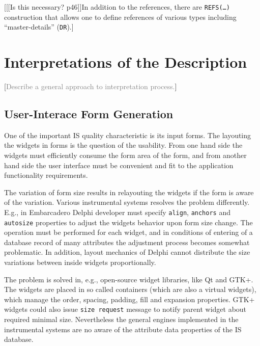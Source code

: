 \documentclass[conference]{IEEEtran}
\newcommand{\e}[2][fcolor]{\textcolor{pcolor}{[}\textcolor{#1}{#2}\textcolor{pcolor}{]}}
\begin{document}
\e{[[Is this necessary? p46]]In addition to the references, there are \texttt{REFS(\ldots)} construction that allows one to define references of various types including ``master-details'' (\texttt{DR}).}











\section{Interpretations of the Description}
\label{sec:interpr-descr}

\e[gray]{Describe a general approach to interpretation process.}

\subsection{User-Interace Form Generation}
\label{sec:user-interace-form}
One of the important IS quality characteristic is its input forms.  The layouting the widgets in forms is the question of the usability.  From one hand side the widgets must efficiently consume the form area of the form, and from another hand side the user interface must be convenient and fit to the application functionality requirements.

The variation of form size results in relayouting the widgets if the form is aware of the variation.  Various instrumental systems resolves the problem differently.  E.g., in Embarcadero Delphi developer must specify \texttt{align}, \texttt{anchors} and \texttt{autosize} properties to adjust the widgets behavior upon form size change.  The operation must be performed for each widget, and in conditions of entering of a database record of many attributes the adjustment process becomes somewhat problematic.  In addition, layout mechanics of Delphi cannot distribute the size variations between inside widgets proportionally.

The problem is solved in, e.g., open-source widget libraries, like Qt and GTK+.  The widgets are placed in so called containers (which are also a virtual widgets), which manage the order, spacing, padding, fill and expansion properties.  GTK+ widgets could also issue \texttt{size request} message to notify parent widget about required minimal size.  Nevertheless the general engines implemented in the instrumental systems are no aware of the attribute data properties of the IS database.
\end{document}
